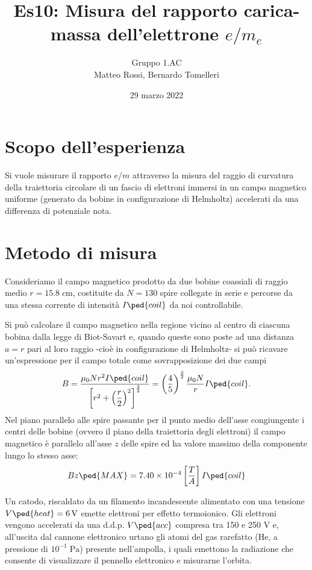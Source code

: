 \documentclass[10pt, a4paper, italian]{article}
\author{Gruppo 1.AC \\ Matteo Rossi, Bernardo Tomelleri}
\title{Es10: Misura del rapporto carica-massa dell'elettrone $e/m_e$}
\begin{document}
\date{29 marzo 2022}
\maketitle

\section{Scopo dell'esperienza}
Si vuole misurare il rapporto $e/m$ attraverso la misura del raggio di
curvatura della traiettoria circolare di un fascio di elettroni immersi in un
campo magnetico uniforme (generato da bobine in configurazione di Helmholtz)
accelerati da una differenza di potenziale nota.

\section{Metodo di misura}
Consideriamo il campo magnetico prodotto da due bobine coassiali di raggio
medio $r = 15.8 \; \si{c\m}$, costituite da $N = 130$ spire collegate in
serie e percorse da una stessa corrente di intensità $I\ped{coil}$ da noi
controllabile.

Si può calcolare il campo magnetico nella regione vicino al centro di ciascuna
bobina dalla legge di Biot-Savart e, quando queste sono poste ad una distanza
$a = r$ pari al loro raggio -cioè in configurazione di Helmholtz- si può
ricavare un'espressione per il campo totale come sovrapposizione dei due campi
\begin{equation}\label{eq: B-helm}
    B = \frac{\mu_0 N r^2 I\ped{coil}}{\left[r^2 + \left(\dfrac{r}{2}\right)^2
    \right]^\frac{3}{2}} =
    \left(\frac{4}{5}\right)^{\frac{3}{2}} \frac{\mu_{0} N}{r} I\ped{coil}.
\end{equation}
Nel piano parallelo alle spire passante per il punto medio dell'asse
congiungente i centri delle bobine (ovvero il piano della traiettoria degli
elettroni) il campo magnetico è parallelo all'asse $z$ delle spire ed ha
valore massimo della componente lungo lo stesso asse:
\begin{equation}\label{eq: Bmax}
Bz\ped{MAX} = 7.40 \times 10^{-4} \left[\frac{T}{A}\right] I\ped{coil}
\end{equation}

Un catodo, riscaldato da un filamento incandescente alimentato con una
tensione $V\ped{heat} = \SI{6}{\V}$ emette elettroni per effetto termoionico.
Gli elettroni vengono accelerati da una d.d.p. $V\ped{acc}$ compresa tra 150
e 250 V e, all'uscita dal cannone elettronico urtano gli atomi del gas
rarefatto (He, a pressione di $10^{-1} \; \si{\Pa}$) presente nell'ampolla,
i quali emettono la radiazione che consente di visualizzare il pennello elettronico e
misurarne l'orbita.
\end{document}
